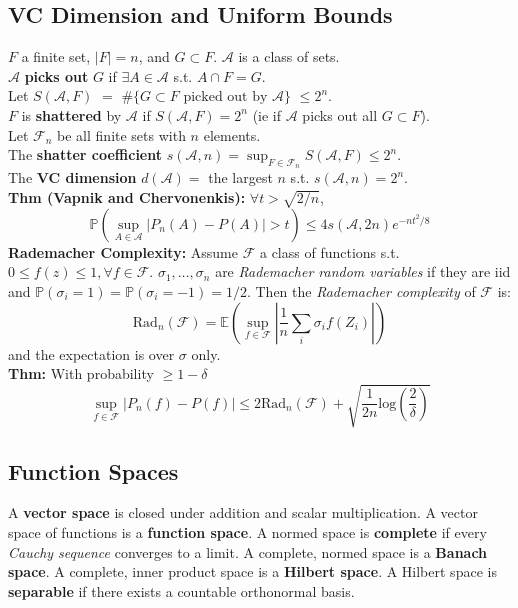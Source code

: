 \documentclass[10pt,twocolumn]{article}
\begin{document}
\subsection*{VC Dimension and Uniform Bounds}
    $F$ a finite set, $|F| = n$, and $G \subset F$. $\mathcal{A}$ is a class of sets.\\
    $\mathcal{A}$ \textbf{picks out} $G$ if $\exists A \in \mathcal{A}$ s.t. $A \cap F = G$.\\
    Let $S(\mathcal{A},F)$ $=$ $\#\{G \subset F \text{ picked out by } \mathcal{A}\}$ $\leq 2^{n}$.\\
    $F$ is \textbf{shattered} by $\mathcal{A}$ if $S(\mathcal{A},F) = 2^{n}$ (ie if $\mathcal{A}$ picks out all $G \subset F$).\\
    Let $\mathcal{F}_{n}$ be all finite sets with $n$ elements.\\
    The \textbf{shatter coefficient} $s(\mathcal{A},n) = \sup_{F \in \mathcal{F}_{n}} S(\mathcal{A},F) \leq 2^{n}$.\\
    The \textbf{VC dimension} $d(\mathcal{A}) =$ the largest $n$ s.t. $s(\mathcal{A},n) = 2^{n}$.\\
    \textbf{Thm (Vapnik and Chervonenkis):} $\forall t>\sqrt{2/n}$, 
    \begin{equation}
        \mathbb{P} \left( \sup_{A \in \mathcal{A}} |P_{n}(A) - P(A)| > t \right) \leq 4 s(\mathcal{A},2n)e^{-nt^{2}/8}
    \end{equation}
    \textbf{Rademacher Complexity:} Assume $\mathcal{F}$ a class of functions s.t. $0 \leq f(z) \leq 1, \forall f \in \mathcal{F}$.
    $\sigma_1,\ldots,\sigma_n$ are \emph{Rademacher random variables} if they are iid and $\mathbb{P}(\sigma_i=1) = \mathbb{P}(\sigma_i=-1) = 1/2$.
    Then the \emph{Rademacher complexity} of $\mathcal{F}$ is:
    \begin{equation}
        \text{Rad}_n(\mathcal{F}) = \mathbb{E} \left( \sup_{f \in \mathcal{F}} \left| \frac{1}{n} \sum_i \sigma_i f(Z_i)  \right|  \right)
    \end{equation}
    and the expectation is over $\sigma$ only.\\
    \textbf{Thm:} With probability $\geq 1-\delta$
    \begin{equation}
        \sup_{f \in \mathcal{F}} \left| P_n(f) - P(f)  \right|
            \leq 2\text{Rad}_n(\mathcal{F}) + \sqrt{\frac{1}{2n} \text{log} \left( \frac{2}{\delta} \right)}
    \end{equation}

\subsection*{Function Spaces}
    A \textbf{vector space} is closed under addition and scalar multiplication. 
    A vector space of functions is a \textbf{function space}. 
    A normed space is \textbf{complete} if every \emph{Cauchy sequence} converges to a limit. 
    A complete, normed space is a \textbf{Banach space}. 
    A complete, inner product space is a \textbf{Hilbert space}.%
    A Hilbert space is \textbf{separable} if there exists a countable orthonormal basis.
\end{document}
